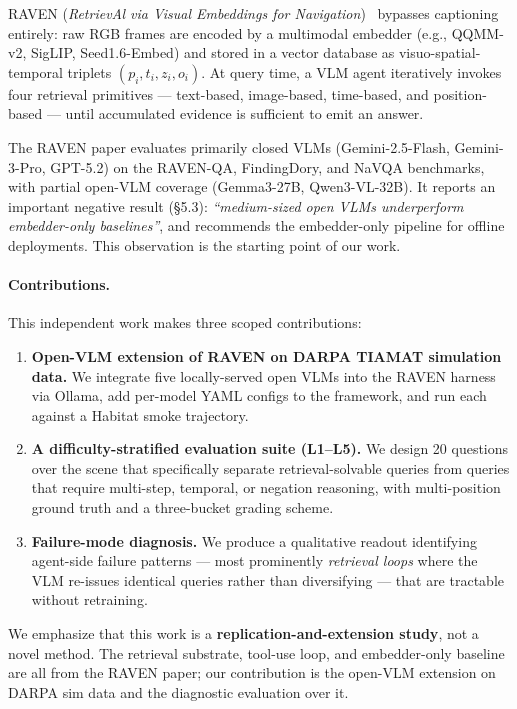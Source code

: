 \documentclass[11pt]{article}
\begin{document}
RAVEN (\emph{RetrievAl via Visual Embeddings for Navigation})~\cite{hu2026raven} bypasses captioning entirely: raw RGB frames are encoded by a multimodal embedder (e.g., QQMM-v2, SigLIP, Seed1.6-Embed) and stored in a vector database as visuo-spatial-temporal triplets $(p_i, t_i, z_i, o_i)$. At query time, a VLM agent iteratively invokes four retrieval primitives --- text-based, image-based, time-based, and position-based --- until accumulated evidence is sufficient to emit an answer.

The RAVEN paper evaluates primarily closed VLMs (Gemini-2.5-Flash, Gemini-3-Pro, GPT-5.2) on the RAVEN-QA, FindingDory, and NaVQA benchmarks, with partial open-VLM coverage (Gemma3-27B, Qwen3-VL-32B). It reports an important negative result (\S5.3): \emph{``medium-sized open VLMs underperform embedder-only baselines''}, and recommends the embedder-only pipeline for offline deployments. This observation is the starting point of our work.

\paragraph{Contributions.} This independent work makes three scoped contributions:
\begin{enumerate}[leftmargin=*,itemsep=2pt]
  \item \textbf{Open-VLM extension of RAVEN on DARPA TIAMAT simulation data.} We integrate five locally-served open VLMs into the RAVEN harness via Ollama, add per-model YAML configs to the framework, and run each against a Habitat smoke trajectory.
  \item \textbf{A difficulty-stratified evaluation suite (L1--L5).} We design 20 questions over the scene that specifically separate retrieval-solvable queries from queries that require multi-step, temporal, or negation reasoning, with multi-position ground truth and a three-bucket grading scheme.
  \item \textbf{Failure-mode diagnosis.} We produce a qualitative readout identifying agent-side failure patterns --- most prominently \emph{retrieval loops} where the VLM re-issues identical queries rather than diversifying --- that are tractable without retraining.
\end{enumerate}

We emphasize that this work is a \textbf{replication-and-extension study}, not a novel method. The retrieval substrate, tool-use loop, and embedder-only baseline are all from the RAVEN paper; our contribution is the open-VLM extension on DARPA sim data and the diagnostic evaluation over it.
\end{document}
